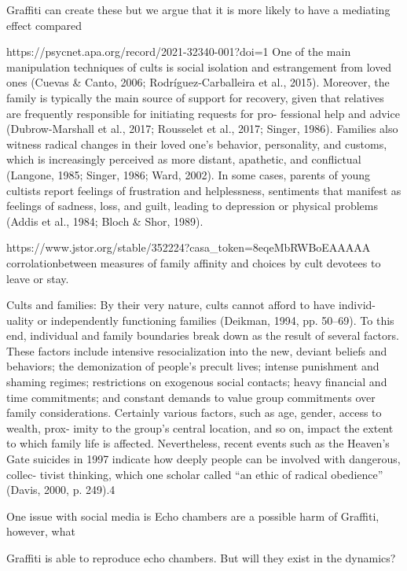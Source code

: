 Graffiti can create these but we argue that it is more likely
to have a mediating effect compared


https://psycnet.apa.org/record/2021-32340-001?doi=1
One of the main manipulation techniques of cults is social isolation and estrangement from loved ones (Cuevas & Canto, 2006; Rodríguez-Carballeira et al., 2015). Moreover, the family is typically the main source of support for recovery, given that relatives are frequently responsible for initiating requests for pro- fessional help and advice (Dubrow-Marshall et al., 2017; Rousselet et al., 2017; Singer, 1986). Families also witness radical changes in their loved one’s behavior, personality, and customs, which is increasingly perceived as more distant, apathetic, and conflictual (Langone, 1985; Singer, 1986; Ward, 2002). In some cases, parents of young cultists report feelings of frustration and helplessness, sentiments that manifest as feelings of sadness, loss, and guilt, leading to depression or physical problems (Addis et al., 1984; Bloch & Shor, 1989).

https://www.jstor.org/stable/352224?casa_token=8eqeMbRWBoEAAAAA%
corrolationbetween measures of family affinity and choices by cult devotees to leave or stay.

Cults and families:
By their very nature, cults cannot afford to have individ- uality or independently functioning families (Deikman, 1994, pp. 50–69). To this end, individual and family boundaries break down as the result of several factors. These factors include intensive resocialization into the new, deviant beliefs and behaviors; the demonization of people’s precult lives; intense punishment and shaming regimes; restrictions on exogenous social contacts; heavy financial and time commitments; and constant demands to value group commitments over family considerations. Certainly various factors, such as age, gender, access to wealth, prox- imity to the group’s central location, and so on, impact the extent to which family life is affected. Nevertheless, recent events such as the Heaven’s Gate suicides in 1997 indicate how deeply people can be involved with dangerous, collec- tivist thinking, which one scholar called “an ethic of radical obedience” (Davis, 2000, p. 249).4

One issue with social media is
Echo chambers are a possible harm of Graffiti,
however, what

Graffiti is able to reproduce echo chambers.
But will they exist in the dynamics?

